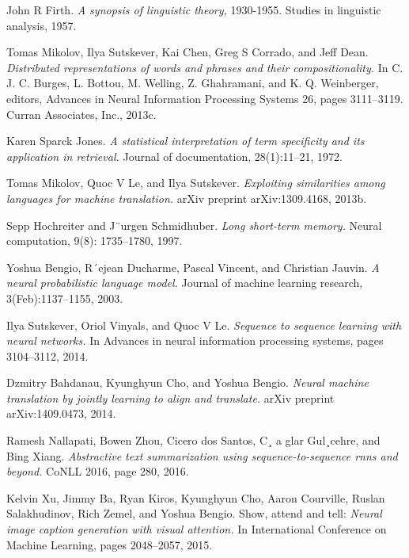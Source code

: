 \documentclass[11pt]{article}
\begin{document}
\newpage
\fi
\pagebreak
\medskip
\begin{thebibliography}{9}
{} 

John R Firth.
\textit{A synopsis of linguistic theory,}  1930-1955. Studies in linguistic analysis, 1957.

Tomas Mikolov, Ilya Sutskever, Kai Chen, Greg S Corrado, and Jeff Dean. \textit{ Distributed representations of words and phrases and their compositionality.} 
In C. J. C. Burges, L. Bottou, M. Welling, Z. Ghahramani, and K. Q. Weinberger, editors, Advances in Neural Information
Processing Systems 26, pages 3111–3119. Curran Associates, Inc., 2013c.

Karen Sparck Jones. \textit{A statistical interpretation of term specificity and its application in retrieval.}
Journal of documentation, 28(1):11–21, 1972.

Tomas Mikolov, Quoc V Le, and Ilya Sutskever. \textit{Exploiting similarities among languages for machine
translation.} arXiv preprint arXiv:1309.4168, 2013b.

Sepp Hochreiter and J¨urgen Schmidhuber. \textit{Long short-term memory.} Neural computation, 9(8):
1735–1780, 1997.

Yoshua Bengio, R´ejean Ducharme, Pascal Vincent, and Christian Jauvin. \textit{A neural probabilistic
language model.} Journal of machine learning research, 3(Feb):1137–1155, 2003.

Ilya Sutskever, Oriol Vinyals, and Quoc V Le. \textit{Sequence to sequence learning with neural networks.}
In Advances in neural information processing systems, pages 3104–3112, 2014.

Dzmitry Bahdanau, Kyunghyun Cho, and Yoshua Bengio. \textit{Neural machine translation by jointly
learning to align and translate.} arXiv preprint arXiv:1409.0473, 2014.


Ramesh Nallapati, Bowen Zhou, Cicero dos Santos, C¸ a glar Gul¸cehre, and Bing Xiang. \textit{ Abstractive
text summarization using sequence-to-sequence rnns and beyond.} CoNLL 2016, page 280, 2016.

Kelvin Xu, Jimmy Ba, Ryan Kiros, Kyunghyun Cho, Aaron Courville, Ruslan Salakhudinov, Rich
Zemel, and Yoshua Bengio. Show, attend and tell: \textit{Neural image caption generation with visual
attention.} In International Conference on Machine Learning, pages 2048–2057, 2015.



\end{thebibliography}
\end{document}
